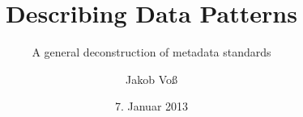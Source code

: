 \title{Describing Data Patterns}
\subtitle{A general deconstruction of metadata standards}
\author{Jakob Voß}
\date{7. Januar 2013}

